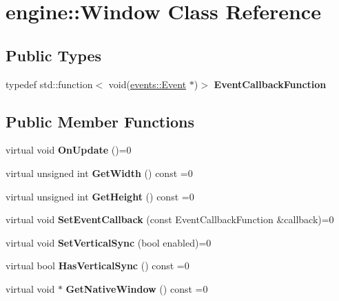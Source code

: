 \hypertarget{classengine_1_1Window}{}\section{engine\+:\+:Window Class Reference}
\label{classengine_1_1Window}
\subsection*{Public Types}
\begin{DoxyCompactItemize}
\item
\mbox{\label{classengine_1_1Window_accae77cf11b87e90027b03c4fb9afe80}}
typedef std\+::function$<$ void(\hyperlink{classengine_1_1events_1_1Event}{events\+::\+Event} $\ast$)$>$ {\bfseries Event\+Callback\+Function}
\end{DoxyCompactItemize}
\subsection*{Public Member Functions}
\begin{DoxyCompactItemize}
\item
\mbox{\label{classengine_1_1Window_acbe42756a4062951c06a3d52970ffc70}}
virtual void {\bfseries On\+Update} ()=0
\item
\mbox{\label{classengine_1_1Window_ab98eea2d4d31b19af72c452d932f51e7}}
virtual unsigned int {\bfseries Get\+Width} () const =0
\item
\mbox{\label{classengine_1_1Window_aaa222cfbb6047cf6bf0337a94f5bdab0}}
virtual unsigned int {\bfseries Get\+Height} () const =0
\item
\mbox{\label{classengine_1_1Window_a7c66a5afd9dbfcc99782847c71826eac}}
virtual void {\bfseries Set\+Event\+Callback} (const Event\+Callback\+Function \&callback)=0
\item
\mbox{\label{classengine_1_1Window_a671eb924c7114d991ed24f0e24325517}}
virtual void {\bfseries Set\+Vertical\+Sync} (bool enabled)=0
\item
\mbox{\label{classengine_1_1Window_a62914a8d91d0c1891a3168a61e5a59ba}}
virtual bool {\bfseries Has\+Vertical\+Sync} () const =0
\item
\mbox{\label{classengine_1_1Window_aa13831c03659b38bd405371b409c13d0}}
virtual void $\ast$ {\bfseries Get\+Native\+Window} () const =0
\end{DoxyCompactItemize}
